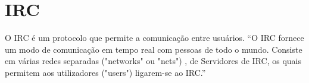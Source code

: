 \section{IRC}

O IRC é um protocolo que permite a comunicação  entre usuários. “O IRC fornece um modo de comunicação em tempo real com pessoas de todo o mundo. Consiste em várias redes separadas ("networks" ou "nets") , de Servidores de IRC, os quais permitem aos utilizadores ("users") ligarem-se ao IRC.”\cite{INTROIRC}

